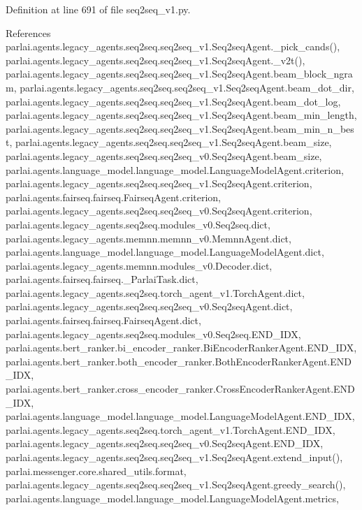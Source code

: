 Definition at line 691 of file seq2seq\+\_\+v1.\+py.



References parlai.\+agents.\+legacy\+\_\+agents.\+seq2seq.\+seq2seq\+\_\+v1.\+Seq2seq\+Agent.\+\_\+pick\+\_\+cands(), parlai.\+agents.\+legacy\+\_\+agents.\+seq2seq.\+seq2seq\+\_\+v1.\+Seq2seq\+Agent.\+\_\+v2t(), parlai.\+agents.\+legacy\+\_\+agents.\+seq2seq.\+seq2seq\+\_\+v1.\+Seq2seq\+Agent.\+beam\+\_\+block\+\_\+ngram, parlai.\+agents.\+legacy\+\_\+agents.\+seq2seq.\+seq2seq\+\_\+v1.\+Seq2seq\+Agent.\+beam\+\_\+dot\+\_\+dir, parlai.\+agents.\+legacy\+\_\+agents.\+seq2seq.\+seq2seq\+\_\+v1.\+Seq2seq\+Agent.\+beam\+\_\+dot\+\_\+log, parlai.\+agents.\+legacy\+\_\+agents.\+seq2seq.\+seq2seq\+\_\+v1.\+Seq2seq\+Agent.\+beam\+\_\+min\+\_\+length, parlai.\+agents.\+legacy\+\_\+agents.\+seq2seq.\+seq2seq\+\_\+v1.\+Seq2seq\+Agent.\+beam\+\_\+min\+\_\+n\+\_\+best, parlai.\+agents.\+legacy\+\_\+agents.\+seq2seq.\+seq2seq\+\_\+v1.\+Seq2seq\+Agent.\+beam\+\_\+size, parlai.\+agents.\+legacy\+\_\+agents.\+seq2seq.\+seq2seq\+\_\+v0.\+Seq2seq\+Agent.\+beam\+\_\+size, parlai.\+agents.\+language\+\_\+model.\+language\+\_\+model.\+Language\+Model\+Agent.\+criterion, parlai.\+agents.\+legacy\+\_\+agents.\+seq2seq.\+seq2seq\+\_\+v1.\+Seq2seq\+Agent.\+criterion, parlai.\+agents.\+fairseq.\+fairseq.\+Fairseq\+Agent.\+criterion, parlai.\+agents.\+legacy\+\_\+agents.\+seq2seq.\+seq2seq\+\_\+v0.\+Seq2seq\+Agent.\+criterion, parlai.\+agents.\+legacy\+\_\+agents.\+seq2seq.\+modules\+\_\+v0.\+Seq2seq.\+dict, parlai.\+agents.\+legacy\+\_\+agents.\+memnn.\+memnn\+\_\+v0.\+Memnn\+Agent.\+dict, parlai.\+agents.\+language\+\_\+model.\+language\+\_\+model.\+Language\+Model\+Agent.\+dict, parlai.\+agents.\+legacy\+\_\+agents.\+memnn.\+modules\+\_\+v0.\+Decoder.\+dict, parlai.\+agents.\+fairseq.\+fairseq.\+\_\+\+Parlai\+Task.\+dict, parlai.\+agents.\+legacy\+\_\+agents.\+seq2seq.\+torch\+\_\+agent\+\_\+v1.\+Torch\+Agent.\+dict, parlai.\+agents.\+legacy\+\_\+agents.\+seq2seq.\+seq2seq\+\_\+v0.\+Seq2seq\+Agent.\+dict, parlai.\+agents.\+fairseq.\+fairseq.\+Fairseq\+Agent.\+dict, parlai.\+agents.\+legacy\+\_\+agents.\+seq2seq.\+modules\+\_\+v0.\+Seq2seq.\+E\+N\+D\+\_\+\+I\+DX, parlai.\+agents.\+bert\+\_\+ranker.\+bi\+\_\+encoder\+\_\+ranker.\+Bi\+Encoder\+Ranker\+Agent.\+E\+N\+D\+\_\+\+I\+DX, parlai.\+agents.\+bert\+\_\+ranker.\+both\+\_\+encoder\+\_\+ranker.\+Both\+Encoder\+Ranker\+Agent.\+E\+N\+D\+\_\+\+I\+DX, parlai.\+agents.\+bert\+\_\+ranker.\+cross\+\_\+encoder\+\_\+ranker.\+Cross\+Encoder\+Ranker\+Agent.\+E\+N\+D\+\_\+\+I\+DX, parlai.\+agents.\+language\+\_\+model.\+language\+\_\+model.\+Language\+Model\+Agent.\+E\+N\+D\+\_\+\+I\+DX, parlai.\+agents.\+legacy\+\_\+agents.\+seq2seq.\+torch\+\_\+agent\+\_\+v1.\+Torch\+Agent.\+E\+N\+D\+\_\+\+I\+DX, parlai.\+agents.\+legacy\+\_\+agents.\+seq2seq.\+seq2seq\+\_\+v0.\+Seq2seq\+Agent.\+E\+N\+D\+\_\+\+I\+DX, parlai.\+agents.\+legacy\+\_\+agents.\+seq2seq.\+seq2seq\+\_\+v1.\+Seq2seq\+Agent.\+extend\+\_\+input(), parlai.\+messenger.\+core.\+shared\+\_\+utils.\+format, parlai.\+agents.\+legacy\+\_\+agents.\+seq2seq.\+seq2seq\+\_\+v1.\+Seq2seq\+Agent.\+greedy\+\_\+search(), parlai.\+agents.\+language\+\_\+model.\+language\+\_\+model.\+Language\+Model\+Agent.\+metrics, 